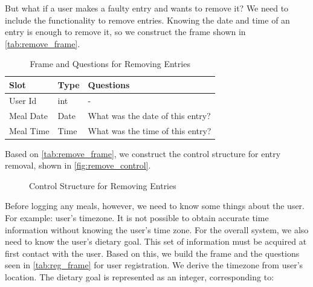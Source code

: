 But what if a user makes a faulty entry and wants to remove it?
We need to include the functionality to remove entries.
Knowing the date and time of an entry is enough to remove it, so we construct the frame shown in \autoref{tab:remove_frame}.

\begin{table}[htbp]
  \caption[Frame and Questions for Removing Entries]{Frame and Questions for Removing Entries}\label{tab:remove_frame}
  \centering
  \begin{tabular}{l|l|l}
    Slot&Type&Questions\\ \toprule
    User Id&int&-\\ \hline
    Meal Date&Date&What was the date of this entry?\\ \hline
    Meal Time&Time&What was the time of this entry?\\ \hline
  \end{tabular}
\end{table}

Based on \autoref{tab:remove_frame}, we construct the control structure for entry removal, shown in \autoref{fig:remove_control}.

\begin{figure}[htbp]
  \centering
  \caption[Control Structure for Removing Entries]{Control Structure for Removing Entries}
  \label{fig:remove_control}
\end{figure}

\newpage

Before logging any meals, however, we need to know some things about the user.
For example: user's timezone.
It is not possible to obtain accurate time information without knowing the user's time zone.
For the overall system, we also need to know the user's dietary goal.
This set of information must be acquired at first contact with the user.
Based on this, we build the frame and the questions seen in \autoref{tab:reg_frame} for user registration.
We derive the timezone from user's location.
The dietary goal is represented as an integer, corresponding to:


